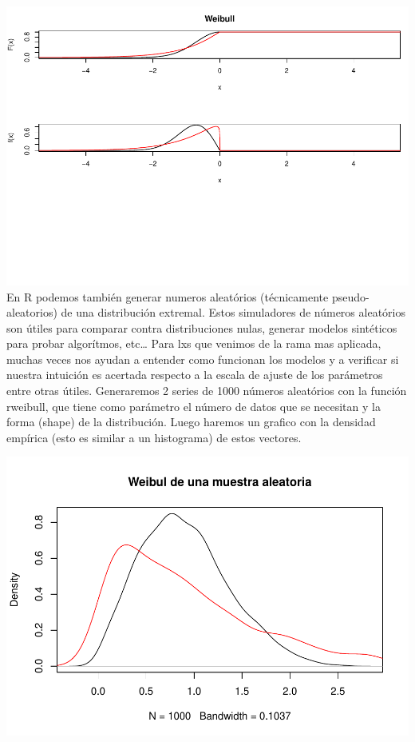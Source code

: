 \documentclass[
  12pt]{article}
\begin{document}
\includegraphics{extremales_files/figure-latex/unnamed-chunk-18-1.pdf}
En R podemos también generar numeros aleatórios (técnicamente
pseudo-aleatorios) de una distribución extremal. Estos simuladores de
números aleatórios son útiles para comparar contra distribuciones nulas,
generar modelos sintéticos para probar algorítmos, etc\ldots{} Para lxs
que venimos de la rama mas aplicada, muchas veces nos ayudan a entender
como funcionan los modelos y a verificar si nuestra intuición es
acertada respecto a la escala de ajuste de los parámetros entre otras
útiles. Generaremos 2 series de 1000 números aleatórios con la función
rweibull, que tiene como parámetro el número de datos que se necesitan y
la forma (shape) de la distribución. Luego haremos un grafico con la
densidad empírica (esto es similar a un histograma) de estos vectores.

\includegraphics{extremales_files/figure-latex/unnamed-chunk-19-1.pdf}
\end{document}
